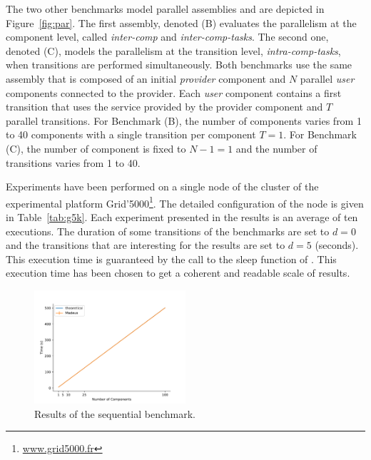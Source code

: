 The two other benchmarks model \mad parallel assemblies and are
depicted in Figure~\ref{fig:par}. The first assembly, denoted (B)
evaluates the parallelism at the component level, called
\emph{inter-comp} and \emph{inter-comp-tasks}. The second one, denoted
(C), models the parallelism at the transition level, \ie
\emph{intra-comp-tasks}, when transitions are performed
simultaneously.
%
Both benchmarks use the same assembly that is composed of an initial
\emph{provider} component and $N$ parallel \emph{user} components
connected to the provider. Each \emph{user} component contains a first
transition that uses the service provided by the provider component
and $T$ parallel transitions. For Benchmark (B), the number of
components varies from 1 to 40 components with a single transition per
component $T=1$. For Benchmark (C), the number of component is fixed
to $N-1=1$ and the number of transitions varies from 1 to 40.

Experiments have been performed on a single node of the \ecotype
cluster of the experimental platform
Grid'5000\footnote{\url{www.grid5000.fr}}. The detailed configuration
of the node is given in Table~\ref{tab:g5k}. Each experiment presented
in the results is an average of ten executions. The duration of some
transitions of the benchmarks are set to $d=0$ and the transitions
that are interesting for the results are set to $d=5$ (seconds). This
execution time is guaranteed by the call to the sleep function of
\python. This execution time has been chosen to get a coherent and
readable scale of results.

\begin{figure}[h]
  \begin{center} 
    \includegraphics[width=0.5\textwidth]{./images/evaluations_sequential.pdf}
    \caption{Results of the sequential benchmark.}
    \label{fig:seqres}
  \end{center}
\end{figure}

